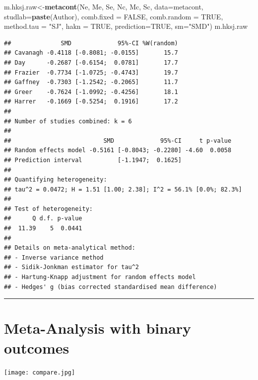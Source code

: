 \documentclass[]{book}
\newenvironment{Shaded}{\begin{snugshade}}{\end{snugshade}}
\newcommand{\DataTypeTok}[1]{\textcolor[rgb]{0.13,0.29,0.53}{#1}}
\newcommand{\KeywordTok}[1]{\textcolor[rgb]{0.13,0.29,0.53}{\textbf{#1}}}
\newcommand{\NormalTok}[1]{#1}
\newcommand{\OtherTok}[1]{\textcolor[rgb]{0.56,0.35,0.01}{#1}}
\newcommand{\StringTok}[1]{\textcolor[rgb]{0.31,0.60,0.02}{#1}}
\begin{document}
\begin{Shaded}
\begin{Highlighting}[]
\NormalTok{m.hksj.raw<-}\KeywordTok{metacont}\NormalTok{(Ne,}
\NormalTok{        Me,}
\NormalTok{        Se,}
\NormalTok{        Nc,}
\NormalTok{        Mc,}
\NormalTok{        Sc,}
        \DataTypeTok{data=}\NormalTok{metacont,}
        \DataTypeTok{studlab=}\KeywordTok{paste}\NormalTok{(Author),}
        \DataTypeTok{comb.fixed =} \OtherTok{FALSE}\NormalTok{,}
        \DataTypeTok{comb.random =} \OtherTok{TRUE}\NormalTok{,}
        \DataTypeTok{method.tau =} \StringTok{"SJ"}\NormalTok{,}
        \DataTypeTok{hakn =} \OtherTok{TRUE}\NormalTok{,}
        \DataTypeTok{prediction=}\OtherTok{TRUE}\NormalTok{,}
        \DataTypeTok{sm=}\StringTok{"SMD"}\NormalTok{)}
\NormalTok{m.hksj.raw}
\end{Highlighting}
\end{Shaded}

\begin{verbatim}
##              SMD             95%-CI %W(random)
## Cavanagh -0.4118 [-0.8081; -0.0155]       15.7
## Day      -0.2687 [-0.6154;  0.0781]       17.7
## Frazier  -0.7734 [-1.0725; -0.4743]       19.7
## Gaffney  -0.7303 [-1.2542; -0.2065]       11.7
## Greer    -0.7624 [-1.0992; -0.4256]       18.1
## Harrer   -0.1669 [-0.5254;  0.1916]       17.2
## 
## Number of studies combined: k = 6
## 
##                          SMD             95%-CI     t p-value
## Random effects model -0.5161 [-0.8043; -0.2280] -4.60  0.0058
## Prediction interval          [-1.1947;  0.1625]              
## 
## Quantifying heterogeneity:
## tau^2 = 0.0472; H = 1.51 [1.00; 2.38]; I^2 = 56.1% [0.0%; 82.3%]
## 
## Test of heterogeneity:
##      Q d.f. p-value
##  11.39    5  0.0441
## 
## Details on meta-analytical method:
## - Inverse variance method
## - Sidik-Jonkman estimator for tau^2
## - Hartung-Knapp adjustment for random effects model
## - Hedges' g (bias corrected standardised mean difference)
\end{verbatim}

\begin{center}\rule{0.5\linewidth}{\linethickness}\end{center}

\hypertarget{binary}{%
\section{Meta-Analysis with binary outcomes}\label{binary}}

\texttt{[image: compare.jpg]}
\end{document}
